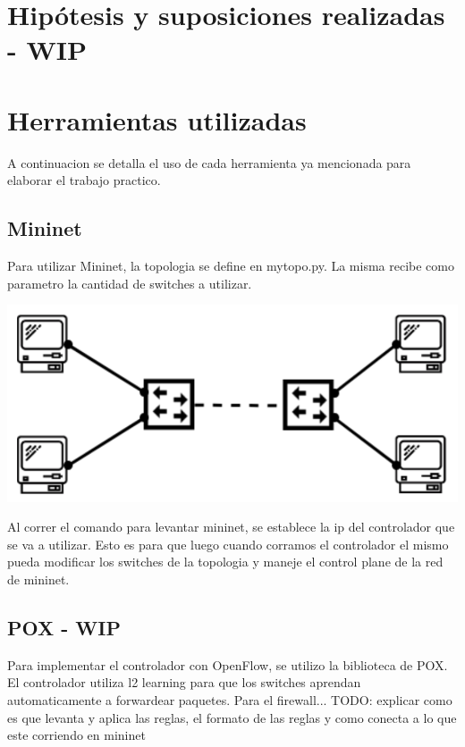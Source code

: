 \documentclass{article}
\begin{document}
\section{Hipótesis y suposiciones realizadas - WIP}\label{hipuxf3tesis-y-suposiciones-realizadas-wip}

\newpage
\section{Herramientas utilizadas}\label{implementaciuxf3n-wip}
A continuacion se detalla el uso de cada herramienta ya mencionada para elaborar el trabajo practico.

\subsection{Mininet}\label{mininet}

Para utilizar Mininet, la topologia se define en mytopo.py. La misma recibe como
parametro la cantidad de switches a utilizar.

\begin{center}
\includegraphics[scale=0.35]{images/mininet_topo.png}
\end{center}

Al correr el comando para levantar mininet, se establece la ip del controlador
que se va a utilizar. Esto es para que luego cuando corramos el controlador el mismo
pueda modificar los switches de la topologia y maneje el control plane de la red
de mininet.

\subsection{POX - WIP}\label{pox}
Para implementar el controlador con OpenFlow, se utilizo la biblioteca de POX.
El controlador utiliza l2 learning para que los switches aprendan automaticamente
a forwardear paquetes.
Para el firewall...
TODO: explicar como es que levanta y aplica las reglas, el formato de las reglas
y como conecta a lo que este corriendo en mininet
\end{document}
